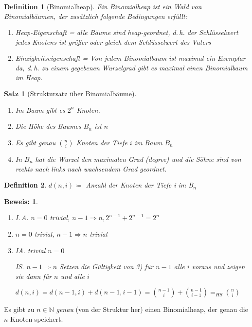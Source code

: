 \documentclass[ngerman,draft,parskip=half*,twoside]{scrreprt}
\theoremstyle{break}
\newtheorem{satz}{Satz}[chapter]
\newtheorem{definition}{Definition}[chapter]
\theoremstyle{nonumberbreak}
\newtheorem{beweis}{Beweis:}
\newcommand*{\N}{\mathbb{N}}        %
\begin{document}
\begin{definition}[Binomialheap]  
Ein Binomialheap ist ein Wald von Binomialbäumen, der zusätzlich folgende Bedingungen erfüllt:
\begin{enumerate}
\item Heap-Eigenschaft = alle Bäume sind heap-geordnet, d.\,h. der Schlüsselwert jedes Knotens ist größer oder gleich dem
Schlüsselwert des Vaters
\item Einzigkeitseigenschaft = Von jedem Binomialbaum ist maximal ein Exemplar da, d.\,h. zu einem gegebenen Wurzelgrad
gibt es maximal einen Binomialbaum im Heap.
\end{enumerate}
\end{definition}

\begin{satz}[Struktursatz über Binomialbäume]
\begin{enumerate}
\item Im Baum gibt es $2^n$ Knoten.
\item Die Höhe des Baumes $B_n$ ist $n$
\item Es gibt genau $\binom{n}{i}$ Knoten der Tiefe $i$ im Baum $B_n$
\item In $B_n$ hat die Wurzel den maximalen Grad (degree) und die Söhne sind von rechts nach links nach wachsendem Grad
geordnet.
\end{enumerate}
\end{satz}

\begin{definition}
$d(n,i)\coloneqq $ Anzahl der Knoten der Tiefe i im B$_n$
\end{definition}

\begin{beweis}
\begin{enumerate}
\item I.\,A. $n=0$ trivial, $n-1 \Rightarrow n, 2^{n-1}+2^{n-1}=2^n$ 
\item $n=0$ trivial, $n-1 \Rightarrow n$ trivial
\item IA. trivial $n=0$

IS. $n-1 \Rightarrow n$ Setzen die Gültigkeit von 3) für $n-1$ alle $i$ voraus und zeigen sie dann für $n$ und alle
$i$

$d(n,i)=d(n-1,i)+d(n-1,i-1)= \binom{n-1}{i}+ \binom{n-1}{i-1}=_{HS} \binom{n}{i}$
\end{enumerate}
\end{beweis}

Es gibt zu $n \in \N$ \emph{genau} (von der Struktur her) einen Binomialheap, der genau die $n$ Knoten
speichert.
 
\end{document}

